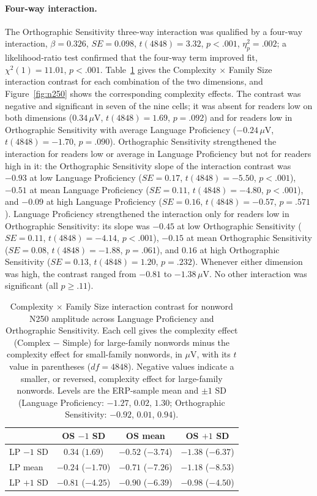 \paragraph*{Four-way interaction.} The Orthographic Sensitivity three-way interaction was qualified by a four-way interaction, $\beta = 0.326$, $SE = 0.098$, $t(4848) = 3.32$, $p < .001$, $\eta^2_p = .002$; a likelihood-ratio test confirmed that the four-way term improved fit, $\chi^2(1) = 11.01$, $p < .001$. Table~\ref{tab:n250nw} gives the Complexity $\times$ Family Size interaction contrast for each combination of the two dimensions, and Figure~\ref{fig:n250} shows the corresponding complexity effects. The contrast was negative and significant in seven of the nine cells; it was absent for readers low on both dimensions ($0.34\,\mu$V, $t(4848) = 1.69$, $p = .092$) and for readers low in Orthographic Sensitivity with average Language Proficiency ($-0.24\,\mu$V, $t(4848) = -1.70$, $p = .090$). Orthographic Sensitivity strengthened the interaction for readers low or average in Language Proficiency but not for readers high in it: the Orthographic Sensitivity slope of the interaction contrast was $-0.93$ at low Language Proficiency ($SE = 0.17$, $t(4848) = -5.50$, $p < .001$), $-0.51$ at mean Language Proficiency ($SE = 0.11$, $t(4848) = -4.80$, $p < .001$), and $-0.09$ at high Language Proficiency ($SE = 0.16$, $t(4848) = -0.57$, $p = .571$). Language Proficiency strengthened the interaction only for readers low in Orthographic Sensitivity: its slope was $-0.45$ at low Orthographic Sensitivity ($SE = 0.11$, $t(4848) = -4.14$, $p < .001$), $-0.15$ at mean Orthographic Sensitivity ($SE = 0.08$, $t(4848) = -1.88$, $p = .061$), and $0.16$ at high Orthographic Sensitivity ($SE = 0.13$, $t(4848) = 1.20$, $p = .232$). Whenever either dimension was high, the contrast ranged from $-0.81$ to $-1.38\,\mu$V. No other interaction was significant (all $p \geq .11$).

\begin{table}[htbp]
	\centering
	\small
	\caption{Complexity $\times$ Family Size interaction contrast for nonword N250 amplitude across Language Proficiency and Orthographic Sensitivity. Each cell gives the complexity effect (Complex $-$ Simple) for large-family nonwords minus the complexity effect for small-family nonwords, in $\mu$V, with its $t$ value in parentheses ($df = 4848$). Negative values indicate a smaller, or reversed, complexity effect for large-family nonwords. Levels are the ERP-sample mean and $\pm 1$ SD (Language Proficiency: $-1.27$, $0.02$, $1.30$; Orthographic Sensitivity: $-0.92$, $0.01$, $0.94$).}
	\label{tab:n250nw}
	\begin{tabular}{lccc}
		\toprule
		& OS $-1$ SD & OS mean & OS $+1$ SD \\
		\midrule
		LP $-1$ SD & $0.34$ ($1.69$) & $-0.52$ ($-3.74$) & $-1.38$ ($-6.37$) \\
		LP mean & $-0.24$ ($-1.70$) & $-0.71$ ($-7.26$) & $-1.18$ ($-8.53$) \\
		LP $+1$ SD & $-0.81$ ($-4.25$) & $-0.90$ ($-6.39$) & $-0.98$ ($-4.50$) \\
		\bottomrule
	\end{tabular}
\end{table}

